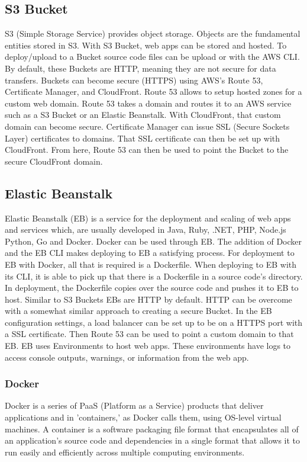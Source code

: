 \subsection{S3 Bucket}
S3 (Simple Storage Service) provides object storage. Objects are the fundamental entities stored in S3. With S3 Bucket, web apps can be stored and hosted. To deploy/upload to a Bucket source code files can be upload or with the AWS CLI. \cite{ref22} By default, these Buckets are HTTP, meaning they are not secure for data transfers. Buckets can become secure (HTTPS) using AWS's Route 53, Certificate Manager, and CloudFront. Route 53 allows to setup hosted zones for a custom web domain. Route 53 takes a domain and routes it to an AWS service such as a S3 Bucket or an Elastic Beanstalk. With CloudFront, that custom domain can become secure. Certificate Manager can issue SSL (Secure Sockets Layer) certificates to domains. That SSL certificate can then be set up with CloudFront. From here, Route 53 can then be used to point the Bucket to the secure CloudFront domain.

\subsection{Elastic Beanstalk}
Elastic Beanstalk (EB) is a service for the deployment and scaling of web apps and services which, are usually developed in Java, Ruby, .NET, PHP, Node.js Python, Go and Docker. \cite{ref23} Docker can be used through EB. The addition of Docker and the EB CLI makes deploying to EB a satisfying process. For deployment to EB with Docker, all that is required is a Dockerfile. When deploying to EB with its CLI, it is able to pick up that there is a Dockerfile in a source code's directory. In deployment, the Dockerfile copies over the source code and pushes it to EB to host. Similar to S3 Buckets EBs are HTTP by default. HTTP can be overcome with a somewhat similar approach to creating a secure Bucket. In the EB configuration settings, a load balancer can be set up to be on a HTTPS port with a SSL certificate. Then Route 53 can be used to point a custom domain to that EB. EB uses Environments to host web apps. These environments have logs to access console outputs, warnings, or information from the web app.

\subsubsection{Docker}
Docker is a series of PaaS (Platform as a Service) products that deliver applications and in 'containers,' as Docker calls them, using OS-level virtual machines. A container is a software packaging file format that encapsulates all of an application's source code and dependencies in a single format that allows it to run easily and efficiently across multiple computing environments. \cite{ref24}

